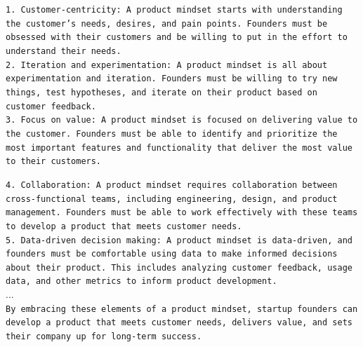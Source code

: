 \documentclass{article}
\begin{document}
\begin{tcolorbox}
\texttt{1. Customer-centricity: A product mindset starts with understanding the customer's needs, desires, and pain points. Founders must be obsessed with their customers and be willing to put in the effort to understand their needs. \\
2. Iteration and experimentation: A product mindset is all about experimentation and iteration. Founders must be willing to try new things, test hypotheses, and iterate on their product based on customer feedback.} \\
\texttt{3. Focus on value: A product mindset is focused on delivering value to the customer. Founders must be able to identify and prioritize the most important features and functionality that deliver the most value to their customers.} \\
\end{tcolorbox}

\begin{tcolorbox}
\texttt{4. Collaboration: A product mindset requires collaboration between cross-functional teams, including engineering, design, and product management. Founders must be able to work effectively with these teams to develop a product that meets customer needs.}\\
\texttt{5. Data-driven decision making: A product mindset is data-driven, and founders must be comfortable using data to make informed decisions about their product. This includes analyzing customer feedback, usage data, and other metrics to inform product development.}\\

...\\

\texttt{By embracing these elements of a product mindset, startup founders can develop a product that meets customer needs, delivers value, and sets their company up for long-term success.}
\end{tcolorbox}


\end{document}
